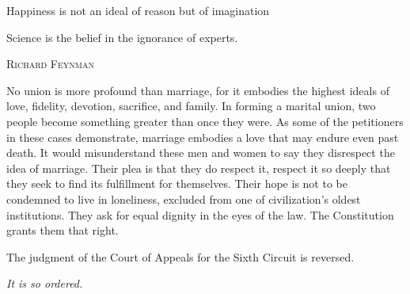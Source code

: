 \documentclass[../butidigress.tex]{subfiles}
\begin{document}
\postepi
\epigraph{Happiness is not an ideal of reason but of imagination}{}
\postepi
\epigraph{Science is the belief in the ignorance of experts.}{\scshape Richard Feynman}
\postepi
\epigraph{No union is more profound than marriage, for it embodies the highest ideals of love, fidelity, devotion, sacrifice, and family. In forming a marital union, two people become something greater than once they were. As some of the petitioners in these cases demonstrate, marriage embodies a love that may endure even past death. It would misunderstand these men and women to say they disrespect the idea of marriage. Their plea is that they do respect it, respect it so deeply that they seek to find its fulfillment for themselves. Their hope is not to be condemned to live in loneliness, excluded from one of civilization's oldest institutions. They ask for equal dignity in the eyes of the law. The Constitution grants them that right.\par\hspace*{2em} The judgment of the Court of Appeals for the Sixth Circuit is reversed. \par\hfill \textit{It is so ordered.}}{}
\end{document}
